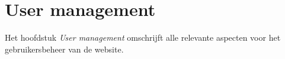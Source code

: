
\section{User management}\label{usermanagement}

Het hoofdstuk \emph{User management} omschrijft alle relevante aspecten voor het gebruikersbeheer van de website.



